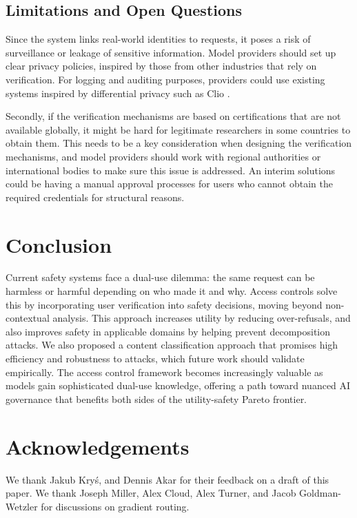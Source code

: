 \documentclass{article}
\theoremstyle{plain}
\theoremstyle{definition}
\theoremstyle{remark}
\begin{document}
\subsection{Limitations and Open Questions}

Since the system links real-world identities to requests, it poses a risk of surveillance or leakage of sensitive information.
Model providers should set up clear privacy policies, inspired by those from other industries that rely on verification.
For logging and auditing purposes, providers could use existing systems inspired by differential privacy such as Clio \cite{tamkin2024clioprivacypreservinginsightsrealworld}.

Secondly, if the verification mechanisms are based on certifications that are not available globally, it might be hard for legitimate researchers in some countries to obtain them.
This needs to be a key consideration when designing the verification mechanisms, and model providers should work with regional authorities or international bodies to make sure this issue is addressed.
An interim solutions could be having a manual approval processes for users who cannot obtain the required credentials for structural reasons.

\section{Conclusion}

Current safety systems face a dual-use dilemma: the same request can be harmless or harmful depending on who made it and why.
Access controls solve this by incorporating user verification into safety decisions, moving beyond non-contextual analysis.
This approach increases utility by reducing over-refusals, and also improves safety in applicable domains by helping prevent decomposition attacks.
We also proposed a content classification approach that promises high efficiency and robustness to attacks, which future work should validate empirically.
The access control framework becomes increasingly valuable as models gain sophisticated dual-use knowledge, offering a path toward nuanced AI governance that benefits both sides of the utility-safety Pareto frontier.

\section*{Acknowledgements}

We thank Jakub Kryś, and Dennis Akar for their feedback on a draft of this paper. We thank Joseph Miller, Alex Cloud, Alex Turner, and Jacob Goldman-Wetzler for discussions on gradient routing.
\end{document}
